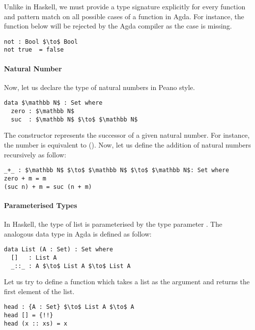 \par Unlike in Haskell, we must provide a type signature explicitly for every
function and pattern match on all possible cases of a function in
Agda. For instance, the function below will be rejected
by the Agda compiler as the case  is missing. 
\begin{lstlisting}[mathescape=true,xleftmargin=.3\textwidth]
not : Bool $\to$ Bool
not true  = false
\end{lstlisting}

\paragraph{Natural Number} Now, let us declare the type of natural
numbers in Peano style. 
\begin{lstlisting}[mathescape=true,xleftmargin=.3\textwidth]
data $\mathbb N$ : Set where
  zero : $\mathbb N$
  suc  : $\mathbb N$ $\to$ $\mathbb N$
\end{lstlisting} 

\par The constructor  represents the successor of a given
natural number. For instance, the number  is equivalent to
(). Now, let us define the addition of natural numbers recursively as follow:
\begin{lstlisting}[mathescape=true,xleftmargin=.3\textwidth]
_+_ : $\mathbb N$ $\to$ $\mathbb N$ $\to$ $\mathbb N$: Set where
zero + m = m
(suc n) + m = suc (n + m)
\end{lstlisting} 

\paragraph{Parameterised Types} In Haskell, the type of list \mb{[a]} is parameterised by the type
parameter . The analogous data type in Agda is defined as follow:
\begin{lstlisting}[mathescape=true,xleftmargin=.3\textwidth]
data List (A : Set) : Set where
  []   : List A
  _::_ : A $\to$ List A $\to$ List A
\end{lstlisting} 

\par Let us try to define a function which takes a
list as the argument and returns the first element of the list. 
\begin{lstlisting}[mathescape=true,xleftmargin=.3\textwidth]
head : {A : Set} $\to$ List A $\to$ A
head [] = {!!}
head (x :: xs) = x
\end{lstlisting} 

